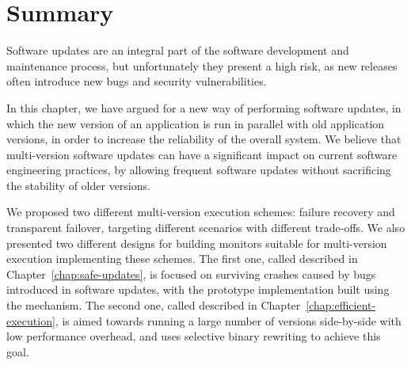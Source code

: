 \section{Summary}
\label{multi-version:summary}

Software updates are an integral part of the software development and
maintenance process, but unfortunately they present a high risk, as new
releases often introduce new bugs and security vulnerabilities.

In this chapter, we have argued for a new way of performing software updates,
in which the new version of an application is run in parallel with old
application versions, in order to increase the reliability of
the overall system. We believe that multi-version software updates can have a
significant impact on current software engineering practices, by allowing
frequent software updates without sacrificing the stability of older versions.

We proposed two different multi-version execution schemes: failure recovery and
transparent failover, targeting different scenarios with different trade-offs.
We also presented two different designs for building monitors suitable for
multi-version execution implementing these schemes. The first one, called \mx
described in Chapter~\ref{chap:safe-updates}, is focused on surviving crashes
caused by bugs introduced in software updates, with the prototype
implementation built using the \ptrace mechanism. The second one, called \varan
described in Chapter~\ref{chap:efficient-execution}, is aimed towards running a
large number of versions side-by-side with low performance overhead, and uses
selective binary rewriting to achieve this goal. 
